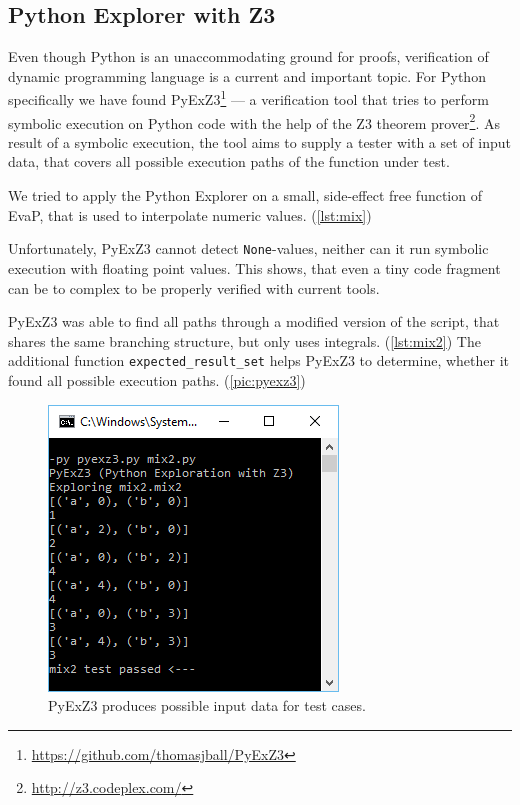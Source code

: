 \subsection{Python Explorer with Z3}

Even though Python is an unaccommodating ground for proofs, verification of dynamic programming language is a current and important topic.
For Python specifically we have found PyExZ3\footnote{\url{https://github.com/thomasjball/PyExZ3}} --- a verification tool that tries to perform symbolic execution on Python code with the help of the Z3 theorem prover\footnote{\url{http://z3.codeplex.com/}}.
As result of a symbolic execution, the tool aims to supply a tester with a set of input data, that covers all possible execution paths of the function under test.

We tried to apply the Python Explorer on a small, side-effect free function of EvaP, that is used to interpolate numeric values. (\autoref{lst:mix})

Unfortunately, PyExZ3 cannot detect \texttt{None}-values, neither can it run symbolic execution with floating point values.
This shows, that even a tiny code fragment can be to complex to be properly verified with current tools.





PyExZ3 was able to find all paths through a modified version of the script, that shares the same branching structure, but only uses integrals. (\autoref{lst:mix2})
The additional function \texttt{expected\_result\_set} helps PyExZ3 to determine, whether it found all possible execution paths. (\autoref{pic:pyexz3})

\begin{figure}[h]
	\centering
	\includegraphics{graphics/PyExZ3-mix2}
	\caption{PyExZ3 produces possible input data for test cases.}
	\label{pic:pyexz3}
\end{figure}
